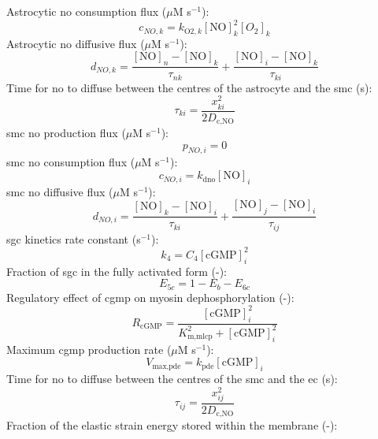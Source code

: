 \documentclass[11pt]{elsarticle}
\newcommand{\mus}{$\mu$M s$^{-1}$\xspace}
\newcommand{\n}{$^{-1}$\xspace}
\begin{document}
%
Astrocytic \gls{no} consumption flux (\mus):
\begin{equation} 
c_{NO,k} = k_{\text{O2},k} [\text{NO}]_k^2 [O_2]_k
\end{equation}
%
Astrocytic \gls{no} diffusive flux (\mus):
\begin{equation} 
d_{NO,k} = \frac{[\text{NO}]_n - [\text{NO}]_k}{\tau_{nk}} + \frac{[\text{NO}]_i - [\text{NO}]_k}{\tau_{ki}}
\end{equation}	
%
Time for \gls{no} to diffuse between the centres of the astrocyte and the \gls{smc} (s):
\begin{equation}
\tau_{ki} = \frac{x_{ki}^2}{2 D_{\text{c,NO}}}
\end{equation}
%
\gls{smc} \gls{no} production flux (\mus):
\begin{equation} 
p_{NO,i} = 0
\end{equation}
%
\gls{smc} \gls{no} consumption flux (\mus):
\begin{equation} 
c_{NO,i} = k_{\text{dno}} [\text{NO}]_i
\end{equation}
%
\gls{smc} \gls{no} diffusive flux (\mus):
\begin{equation} 
d_{NO,i} = \frac{[\text{NO}]_k - [\text{NO}]_i}{\tau_{ki}} + \frac{[\text{NO}]_j - [\text{NO}]_i}{\tau_{ij}}
\end{equation}
%
\gls{sgc} kinetics rate constant (s\n): %
\begin{equation} 
k_4 = C_4 [\text{cGMP}]_i^{2}
\end{equation}	
%
Fraction of \gls{sgc} in the fully activated form (-):%
\begin{equation} 
E_{5c} = 1 - E_b - E_{6c}
\end{equation}	
%
Regulatory effect of \gls{cgmp} on myosin dephosphorylation (-):			%
\begin{equation} 
R_{\text{cGMP}} = \frac{[\text{cGMP}]_i^2}{K_{\text{m,mlcp}}^2 + [\text{cGMP}]_i^2}
\end{equation}
%	
Maximum \gls{cgmp} production rate (\mus):
\begin{equation}
V_{\text{max,pde}} = k_{\text{pde}} [\text{cGMP}]_i
\end{equation}
%
Time for \gls{no} to diffuse between the centres of the \gls{smc} and the \gls{ec} (s):
\begin{equation}
\tau_{ij} = \frac{x_{ij}^2}{2 D_{\text{c,NO}}}
\end{equation}
%
Fraction of the elastic strain energy stored within the membrane (-): 
\end{document}
